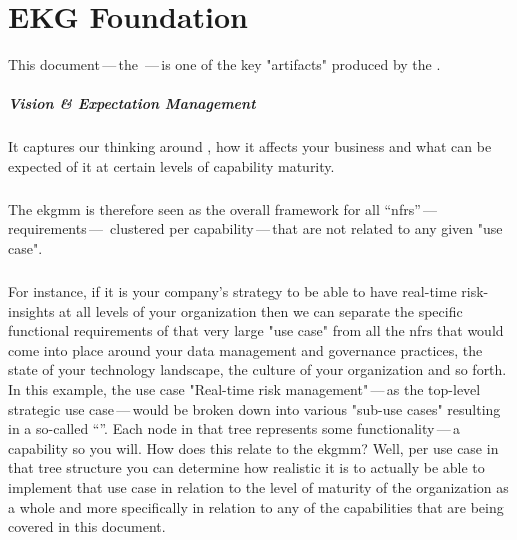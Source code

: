 \chapter{EKG Foundation}
\label{ch:ekg-foundation}

This document\,---\,the \,---\,is one of the key "artifacts" produced by the .

\paragraph{Vision \& Expectation Management}

It captures our thinking around ,
how it affects your business and what can be expected of it at certain levels of capability maturity.

\paragraph{}

The \gls{ekgmm} is therefore seen as the overall framework for all \enquote{\glspl{nfr}}\,---\,requirements\,---\,%
clustered per capability\,---\,that are not  related to any given "use case".

\paragraph{}

For instance, if it is your company's strategy to be able to have real-time risk-insights at all levels
of your organization then we can separate the specific functional requirements of that very large "use case" from
all the \glspl{nfr} that would come into place around your data management and governance practices, the state of
your technology landscape, the culture of your organization and so forth.
In this example, the use case "Real-time risk management"\,---\,as the top-level strategic use case\,---\,would be
broken down into various "sub-use cases" resulting in a so-called \enquote{}.
Each node in that tree represents some functionality\,---\,a capability so you will.
How does this relate to the \gls{ekgmm}? Well, per use case in that tree structure you can determine how realistic
it is to actually be able to implement that use case in relation to the level of maturity of the organization as a
whole and more specifically in relation to any of the capabilities that are being covered in this document.

